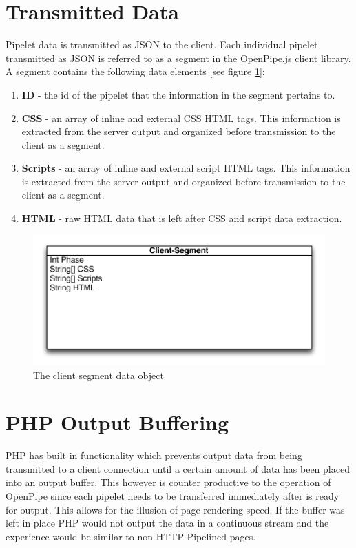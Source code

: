 \documentclass[12pt]{report}
\begin{document}
\section{Transmitted Data}
Pipelet data is transmitted as JSON to the client. Each individual pipelet transmitted as JSON is referred to as a segment in the OpenPipe.js client library. A segment contains the following data elements [see figure \ref{fig:clientSegmentDataObject}]:

\begin{enumerate}
\item \textbf{ID} - the id of the pipelet that the information in the segment pertains to. 
\item \textbf{CSS} - an array of inline and external CSS HTML tags. This information is extracted from the server output and organized before transmission to the client as a segment.
\item \textbf{Scripts} - an array of inline and external script HTML tags. This information is extracted from the server output and organized before transmission to the client as a segment.
\item \textbf{HTML} - raw HTML data that is left after CSS and script data extraction.
\end{enumerate}

\begin{figure}[H]
\centering
\includegraphics[width=\textwidth,keepaspectratio]{figures/images/client_segment_data_object.pdf}
\caption{The client segment data object}
\label{fig:clientSegmentDataObject}
\end{figure}

\section{PHP Output Buffering}
PHP has built in functionality which prevents output data from being transmitted
to a client connection until a certain amount of data has been placed into an output buffer. This however is counter productive to the operation of OpenPipe since each pipelet needs to be transferred immediately after is ready for output. This allows for the illusion of page rendering speed. If the buffer was left in place PHP would not output the data in a continuous stream and the experience would be similar to non HTTP Pipelined pages. 
\end{document}
